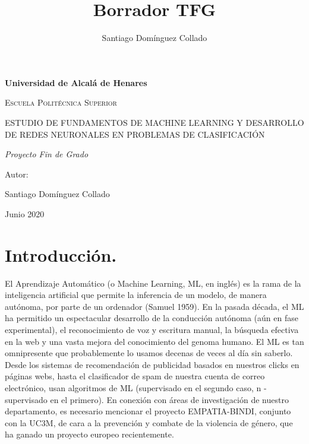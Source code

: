 \documentclass[a4paper,11pt]{article}
\author{Santiago Domínguez Collado}
\title{Borrador TFG}
\begin{document}
\begin{titlepage}
\centering
{\bfseries\LARGE Universidad de Alcalá de Henares \par}
\vspace{1cm}
{\scshape\Large Escuela Politécnica Superior \par}
\vspace{3cm}
{\scshape\Large ESTUDIO DE FUNDAMENTOS DE MACHINE LEARNING Y DESARROLLO DE REDES NEURONALES EN PROBLEMAS DE CLASIFICACIÓN \par}
\vspace{3cm}
{\itshape\Large Proyecto Fin de Grado \par}
\vfill
{\Large Autor: \par}
{\Large Santiago Domínguez Collado \par}
\vfill
{\Large Junio 2020 \par}
\end{titlepage}


\tableofcontents



\newpage
\section{Introducción.}
El Aprendizaje Automático (o Machine Learning, ML, en inglés) es la rama de la inteligencia artificial que permite la inferencia de un modelo, de manera autónoma, por parte de un ordenador (Samuel 1959). En la pasada década, el ML ha permitido un espectacular desarrollo de la conducción autónoma (aún en fase experimental), el reconocimiento de voz y escritura manual, la búsqueda efectiva en la web y una vasta mejora del conocimiento del genoma humano. El ML es tan omnipresente que probablemente lo usamos decenas de veces al día sin saberlo. Desde los sistemas de recomendación de publicidad basados en nuestros clicks en páginas webs, hasta el clasificador de spam de nuestra cuenta de correo electrónico, usan algoritmos de ML (supervisado en el segundo caso, n -supervisado en el primero). En conexión con áreas de investigación de nuestro departamento, es necesario mencionar el proyecto EMPATIA-BINDI, conjunto con la UC3M, de cara a la prevención y combate de la violencia de género, que ha ganado un proyecto europeo recientemente.\\
\end{document}
